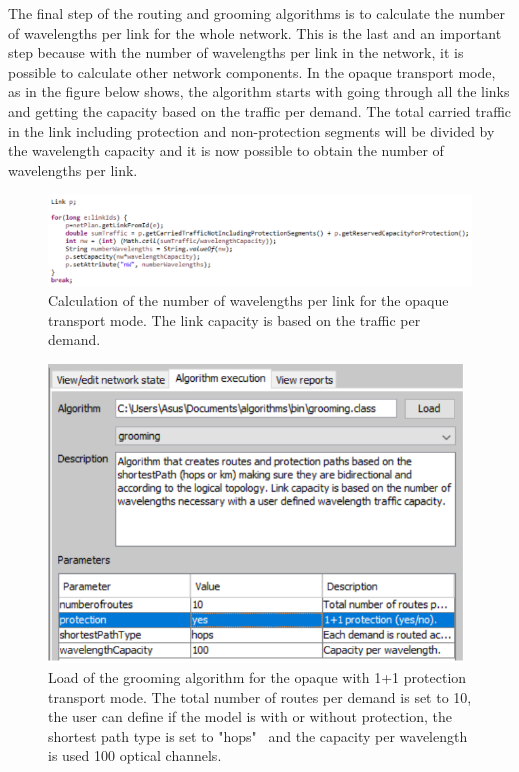 \vspace{11pt}
The final step of the routing and grooming algorithms is to calculate the number of wavelengths per link for the whole network. This is the last and an important step because with the number of wavelengths per link in the network, it is possible to calculate other network components. In the opaque transport mode, as in the figure below shows, the algorithm starts with going through all the links and getting the capacity based on the traffic per demand. The total carried traffic in the link including protection and non-protection segments will be divided by the wavelength capacity and it is now possible to obtain the number of wavelengths per link.

\begin{figure}[H]
\centering
\includegraphics[width=16cm]{sdf/heuristic/opaque_protection/figures/grooming_opaque_protec3}
\caption{Calculation of the number of wavelengths per link for the opaque transport mode. The link capacity is based on the traffic per demand.}
\label{grooming_opaque_surv2}
\end{figure}

\begin{figure}[H]
\centering
\includegraphics[width=11cm]{sdf/heuristic/opaque_protection/figures/grooming_opaque_protec4}
\caption{Load of the grooming algorithm for the opaque with 1+1 protection transport mode. The total number of routes per demand is set to 10, the user can define if the model is with or without protection, the shortest path type is set to "hops" \ and the capacity per wavelength is used 100 optical channels.}
\label{grooming_opaque_surv3}
\end{figure}


